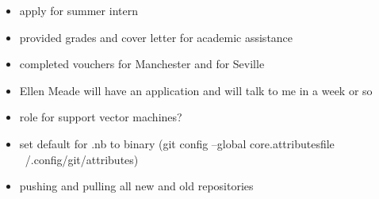 \documentclass[hyperref]{labbook}
\begin{document}



\begin{itemize}
\item apply for summer intern
\item provided grades and cover letter for academic assistance
\item completed vouchers for Manchester and for Seville
\end{itemize}

\begin{itemize}
\item Ellen Meade will have an application  and will talk to me in a week or so
\item role for support vector machines?
\end{itemize}

\begin{itemize}
\item set default for .nb to binary (git config --global core.attributesfile ~/.config/git/attributes)
\item pushing and pulling all new and old repositories
\end{itemize}
\end{document}
